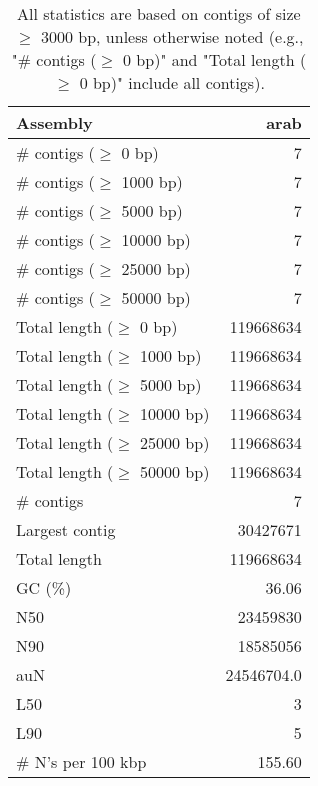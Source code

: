 \documentclass[12pt,a4paper]{article}
\begin{document}
\begin{table}[ht]
\begin{center}
\caption{All statistics are based on contigs of size $\geq$ 3000 bp, unless otherwise noted (e.g., "\# contigs ($\geq$ 0 bp)" and "Total length ($\geq$ 0 bp)" include all contigs).}
\begin{tabular}{|l*{1}{|r}|}
\hline
Assembly & arab \\ \hline
\# contigs ($\geq$ 0 bp) & 7 \\ \hline
\# contigs ($\geq$ 1000 bp) & 7 \\ \hline
\# contigs ($\geq$ 5000 bp) & 7 \\ \hline
\# contigs ($\geq$ 10000 bp) & 7 \\ \hline
\# contigs ($\geq$ 25000 bp) & 7 \\ \hline
\# contigs ($\geq$ 50000 bp) & 7 \\ \hline
Total length ($\geq$ 0 bp) & 119668634 \\ \hline
Total length ($\geq$ 1000 bp) & 119668634 \\ \hline
Total length ($\geq$ 5000 bp) & 119668634 \\ \hline
Total length ($\geq$ 10000 bp) & 119668634 \\ \hline
Total length ($\geq$ 25000 bp) & 119668634 \\ \hline
Total length ($\geq$ 50000 bp) & 119668634 \\ \hline
\# contigs & 7 \\ \hline
Largest contig & 30427671 \\ \hline
Total length & 119668634 \\ \hline
GC (\%) & 36.06 \\ \hline
N50 & 23459830 \\ \hline
N90 & 18585056 \\ \hline
auN & 24546704.0 \\ \hline
L50 & 3 \\ \hline
L90 & 5 \\ \hline
\# N's per 100 kbp & 155.60 \\ \hline
\end{tabular}
\end{center}
\end{table}
\end{document}
